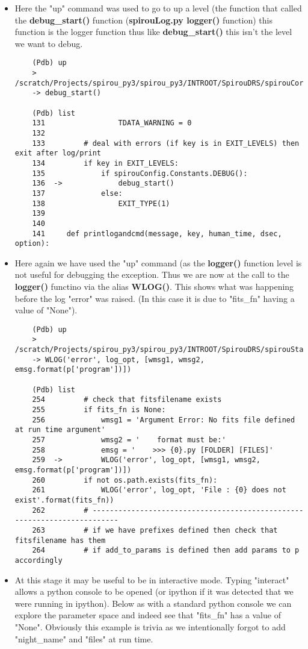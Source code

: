 \documentclass[11pt]{article}
\begin{document}
\begin{itemize}
\item
  Here the "up" command was used to go to up a level (the function that
  called the \textbf{debug\_start()} function (\textbf{spirouLog.py
  logger()} function) this function is the logger function thus like
  \textbf{debug\_start()} this isn't the level we want to debug.

\begin{verbatim}
    (Pdb) up
    > /scratch/Projects/spirou_py3/spirou_py3/INTROOT/SpirouDRS/spirouCore/spirouLog.py(136)logger()
    -> debug_start()

    (Pdb) list
    131                 TDATA_WARNING = 0
    132
    133         # deal with errors (if key is in EXIT_LEVELS) then exit after log/print
    134         if key in EXIT_LEVELS:
    135             if spirouConfig.Constants.DEBUG():
    136  ->             debug_start()
    137             else:
    138                 EXIT_TYPE(1)
    139
    140
    141     def printlogandcmd(message, key, human_time, dsec, option):
\end{verbatim}
\item
  Here again we have used the "up" command (as the \textbf{logger()}
  function level is not useful for debugging the exception. Thus we are
  now at the call to the \textbf{logger()} functino via the alias
  \textbf{WLOG()}. This shows what was happening before the log "error"
  was raised. (In this case it is due to "fits\_fn" having a value of
  "None").

\begin{verbatim}
    (Pdb) up
    > /scratch/Projects/spirou_py3/spirou_py3/INTROOT/SpirouDRS/spirouStartup/spirouStartup.py(259)initial_file_setup()
    -> WLOG('error', log_opt, [wmsg1, wmsg2, emsg.format(p['program'])])

    (Pdb) list
    254         # check that fitsfilename exists
    255         if fits_fn is None:
    256             wmsg1 = 'Argument Error: No fits file defined at run time argument'
    257             wmsg2 = '    format must be:'
    258             emsg = '    >>> {0}.py [FOLDER] [FILES]'
    259  ->         WLOG('error', log_opt, [wmsg1, wmsg2, emsg.format(p['program'])])
    260         if not os.path.exists(fits_fn):
    261             WLOG('error', log_opt, 'File : {0} does not exist'.format(fits_fn))
    262         # -------------------------------------------------------------------------
    263         # if we have prefixes defined then check that fitsfilename has them
    264         # if add_to_params is defined then add params to p accordingly
\end{verbatim}
\item
  At this stage it may be useful to be in interactive mode. Typing
  "interact" allows a python console to be opened (or ipython if it was
  detected that we were running in ipython). Below as with a standard
  python console we can explore the parameter space and indeed see that
  "fits\_fn" has a value of "None". Obviously this example is trivia as
  we intentionally forgot to add "night\_name" and "files" at run time.


\end{itemize}
\end{document}
